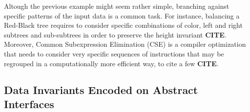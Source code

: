 \documentclass[conference, fleqn]{IEEEtran}
\newcommand{\tocite}{\textbf{CITE}}
\newcommand{\megadeth}{\emph{MegaDeTH}\xspace}
\newcommand{\dragen}{\textbf{DRAGEN}\xspace}
\begin{document}




Altough the previous example might seem rather simple, branching against
specific patterns of the input data is a common task.
%
For instance, balancing a Red-Black tree requires to consider specific
combinations of color, left and right subtrees and sub-subtrees in order to
preserve the height invariant \tocite.
%
Moreover, Common Subexpression Elimination (CSE) is a compiler optimization that
needs to consider very specific sequences of instructions that may be regrouped
in a computationally more efficient way, to cite a few \tocite.



\subsection*{\textbf{Data Invariants Encoded on Abstract Interfaces}}
\end{document}
